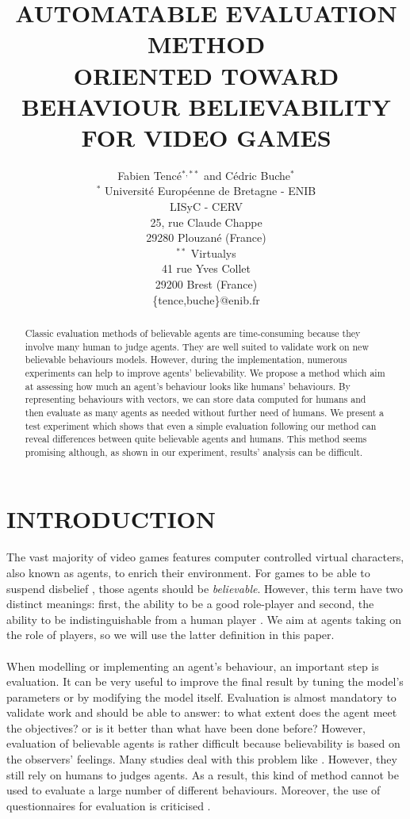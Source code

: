 \documentclass[a4paper,twocolumn]{article}
\title{AUTOMATABLE EVALUATION METHOD\\ORIENTED TOWARD BEHAVIOUR BELIEVABILITY\\FOR VIDEO GAMES}
\author{
Fabien Tenc\'e$^{*,**}$ and C\'edric Buche$^*$\\
$^*$ Universit\'e Europ\'eenne de Bretagne - ENIB\\
LISyC - CERV\\
25, rue Claude Chappe\\
29280 Plouzan\'e (France)\\
$^{**}$ Virtualys\\
41 rue Yves Collet\\
29200 Brest (France)\\
\{tence,buche\}@enib.fr
}
\date{}
\begin{document}
\maketitle
\thispagestyle{empty}


\begin{abstract}
Classic evaluation methods of believable agents are time-consuming because they involve many human to judge agents. They are well suited to validate work on new believable behaviours models. However, during the implementation, numerous experiments can help to improve agents' believability. We propose a method which aim at assessing how much an agent's behaviour looks like humans' behaviours. By representing behaviours with vectors, we can store data computed for humans and then evaluate as many agents as needed without further need of humans. We present a test experiment which shows that even a simple evaluation following our method can reveal differences between quite believable agents and humans. This method seems promising although, as shown in our experiment, results' analysis can be difficult. %
\end{abstract}

\section{INTRODUCTION}
\paragraph{}%
The vast majority of video games features computer controlled virtual characters, also known as agents, to enrich their environment. For games to be able to suspend disbelief \cite{Bates1992}, those agents should be \emph{believable}. However, this term have two distinct meanings: first, the ability to be a good role-player and second, the ability to be indistinguishable from a human player \cite{Livingstone2006}. We aim at agents taking on the role of players, so we will use the latter definition in this paper.
\paragraph{}%
When modelling or implementing an agent's behaviour, an important step is evaluation. It can be very useful to improve the final result by tuning the model's parameters or by modifying the model itself. Evaluation is almost mandatory to validate work and should be able to answer: to what extent does the agent meet the objectives? or is it better than what have been done before? However, evaluation of believable agents is rather difficult because believability is based on the observers' feelings. Many studies deal with this problem like \cite{MacNamee2004,Livingstone2006,Gorman2006}. However, they still rely on humans to judges agents. As a result, this kind of method cannot be used to evaluate a large number of different behaviours. Moreover, the use of questionnaires for evaluation is criticised \cite{Slater2004}.
\end{document}
